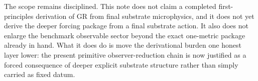 \documentclass[11pt]{article}
\begin{document}
The scope remains disciplined. This note does not claim a completed first-principles derivation of GR from final substrate microphysics, and it does not yet derive the deeper forcing package from a final substrate action. It also does not enlarge the benchmark observable sector beyond the exact one-metric package already in hand. What it does do is move the derivational burden one honest layer lower: the present primitive observer-reduction chain is now justified as a forced consequence of deeper explicit substrate structure rather than simply carried as fixed datum.
\end{document}
